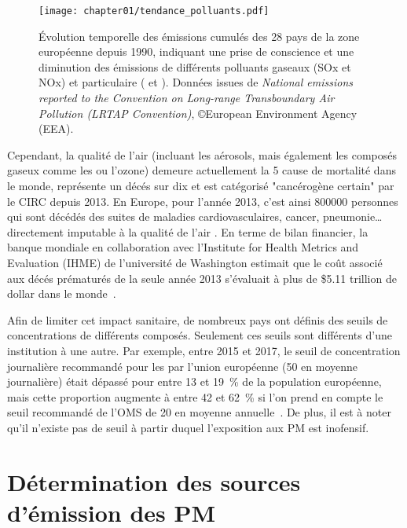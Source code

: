 \begin{figure}[ht]
    \centering
    \texttt{[image: chapter01/tendance\_polluants.pdf]}
    \caption{Évolution temporelle des émissions cumulés des 28 pays de la zone européenne
    depuis 1990, indiquant une prise de conscience et une diminution des émissions de
différents polluants gaseaux (SOx et NOx) et particulaire (\PMdix{} et \PMdc). Données
issues de \textit{National emissions reported to the Convention on Long-range
Transboundary Air Pollution (LRTAP Convention)}, ©European Environment Agency (EEA).}%
\label{fig:chapter01/tendance_polluants}
\end{figure}


Cependant, la qualité de l'air (incluant les aérosols, mais également les
composés gaseux comme les  ou l'ozone) demeure actuellement la 5\ieme{} cause de
mortalité dans le monde, représente un décés sur dix et est catégorisé "cancérogène
certain" par le CIRC depuis 2013. En Europe, pour l'année 2013, c'est
ainsi \num{800000} personnes qui sont décédés des suites de maladies cardiovasculaires,
cancer, pneumonie… directement imputable à la qualité de l'air
\autocite{worldhealthorganizationAmbient2016}.
En terme de bilan financier, la banque mondiale en collaboration avec l'Institute for
Health Metrics and Evaluation (IHME) de l'université de Washington estimait que le coût
associé aux décés prématurés de la seule année 2013 s'évaluait à plus de \$5.11 trillion
de dollar dans le monde~\autocite{worldbankCost2016}.

Afin de limiter cet impact sanitaire, de nombreux pays ont définis des seuils de
concentrations de différents composés. Seulement ces seuils sont différents d'une
institution à une autre. Par exemple, entre 2015 et 2017, le seuil de concentration
journalière recommandé pour les \PMdix{} par l'union européenne (\SI{50}{\ugm} en moyenne
journalière) était dépassé pour entre 13 et 19~\% de la population européenne, mais cette
proportion augmente à entre 42 et 62~\% si l'on prend en compte le seuil recommandé de
l'OMS de \SI{20}{\ugm} en moyenne annuelle~\autocite{europeanenvironmentagencyAir2019}.
De plus, il est à noter qu'il n'existe pas de seuil à partir duquel l'exposition aux PM
est inofensif.

\section{Détermination des sources d'émission des PM}%
\label{sec:source_apportionment_of_pm}

